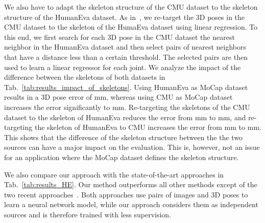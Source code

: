 \documentclass[10pt,journal,compsoc]{IEEEtran}
\begin{document}
We also have to adapt the skeleton structure of the CMU dataset to the skeleton structure of the HumanEva dataset. As in~\cite{Yasin_2016_CVPR}, we re-target the 3D poses in the CMU dataset to the skeleton of the HumaEva dataset using linear regression. 
To this end, we first search for each 3D pose in the CMU dataset the nearest neighbor in the HumanEva dataset and then select pairs of nearest neighbors that have a distance less than a certain threshold. The selected pairs are then used to learn a linear regressor for each joint. We analyze the impact of the difference between the skeletons of both datasets in Tab.~\ref{tab:results_impact_of_skeletons}. 
Using HumanEva as MoCap dataset results in a 3D pose error of mm, whereas using CMU as MoCap dataset increases the error significantly to mm.
Re-targeting the skeletons of the CMU dataset to the skeleton of HumanEva reduces the error from mm to mm, and re-targeting the skeleton of HumanEva to CMU increases the 
error from mm to mm. This shows that the difference of the skeleton structure between the the two sources can have a major impact on the evaluation. This is, however, not an issue for an application where the MoCap dataset defines the skeleton structure.   

We also compare our approach with the state-of-the-art approaches 
\cite{Ilya_2014,Wang_2014_CVPR,Radwan-2013iccv,SimoSerraCVPR2013,SimoSerraCVPR2012,Bo-2010,Yasin_2016_CVPR,Moreno_arxiv2016} in Tab.~\ref{tab:results_HE}. 
Our method outperforms all other methods except of the two recent approaches~\cite{Moreno_arxiv2016,popa2017CVPRmultitask}. Both approaches use pairs of images and 3D poses to learn a neural network model, while our approach considers them as independent sources and is therefore trained with less supervision.     

\begin{table}[t]
\centering
{}
\caption{Impact of different skeleton structures. The symbol  indicates retargeting of the skeleton structure of one dataset to the skeleton of another dataset.}
\label{tab:results_impact_of_skeletons}
\end{table}
\end{document}
